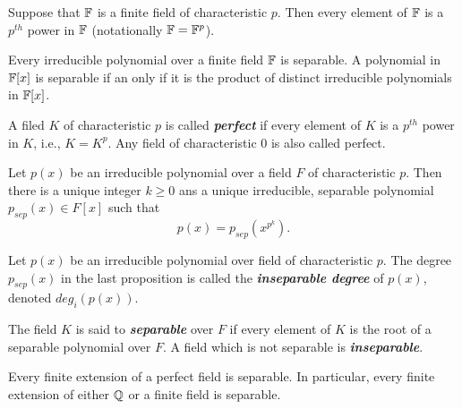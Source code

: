 \nl

\begin{cor}
Suppose that $\mathbb{F}$ is a finite field of characteristic $p$. Then every element of $\mathbb{F}$ is a $p^{th}$ power in $\mathbb{F}$ (notationally $\mathbb{F} = \mathbb{F}^p$).
\end{cor}

\nl

\begin{prop}
Every irreducible polynomial over a finite field $\mathbb{F}$ is separable. A polynomial in $\mathbb{F}[x]$ is separable if an only if it is the product of distinct irreducible polynomials in $\mathbb{F}[x]$.
\end{prop}

\nl

\begin{defn}
A filed $K$ of characteristic $p$ is called \textit{\textbf{perfect}} if every element of $K$ is a $p^{th}$ power in $K$, i.e., $K = K^p$. Any field of characteristic 0 is also called perfect.
\end{defn}

\nl

\begin{prop}
Let $p(x)$ be an irreducible polynomial over a field $F$ of characteristic $p$. Then there is a unique integer $k\geq 0$ ans a unique irreducible, separable polynomial $p_{sep}(x)\in F[x]$ such that
\[p(x) = p_{sep}(x^{p^k}). \]
\end{prop}

\nl

\begin{defn}
Let $p(x)$ be an irreducible polynomial over field of characteristic $p$. The degree $p_{sep}(x)$ in the last proposition is called the \textit{\textbf{inseparable degree}} of $p(x)$, denoted $deg_i(p(x))$.
\end{defn}

\nl

\begin{defn}
The field $K$ is said to \textit{\textbf{separable}} over $F$ if every element of $K$ is the root of a separable polynomial over $F$. A field which is not separable is \textit{\textbf{inseparable}}.
\end{defn}

\nl

\begin{cor}
Every finite extension of a perfect field is separable. In particular, every finite extension of either $\mathbb{Q}$ or a finite field is separable.
\end{cor}

